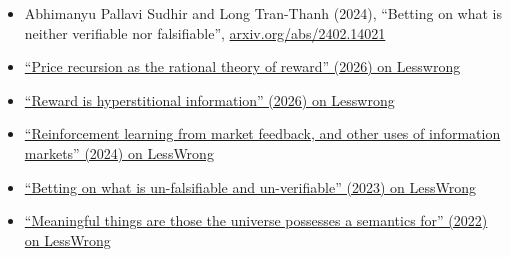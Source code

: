 \begin{itemize}
      \item Abhimanyu Pallavi Sudhir and Long Tran-Thanh (2024), ``Betting on what is neither verifiable nor falsifiable'', \href{https://arxiv.org/abs/2402.14021}{arxiv.org/abs/2402.14021}
      \item \href{https://www.lesswrong.com/posts/MAqgva9hLGTMX2wL7/price-recursion-is-the-rational-theory-of-reward}{``Price recursion as the rational theory of reward'' (2026) on Lesswrong}
      \item \href{https://www.lesswrong.com/posts/z7DBBn9RaDyKJRidg/reward-is-hyperstitional-information}{``Reward is hyperstitional information'' (2026) on Lesswrong}
      \item \href{https://www.lesswrong.com/posts/Y79tkWhvHi8GgLN2q/reinforcement-learning-from-market-feedback-and-other-uses}{``Reinforcement learning from market feedback, and other uses of information markets'' (2024) on LessWrong}
      \item \href{https://www.lesswrong.com/posts/id84oe3LxdzoqinKA/betting-on-what-is-un-falsifiable-and-un-verifiable}{``Betting on what is un-falsifiable and un-verifiable'' (2023) on LessWrong}
      \item \href{https://www.lesswrong.com/posts/xqxXrAohXSD3akYCg/meaningful-things-are-those-the-universe-possesses-a}{``Meaningful things are those the universe possesses a semantics for'' (2022) on LessWrong}
\end{itemize}